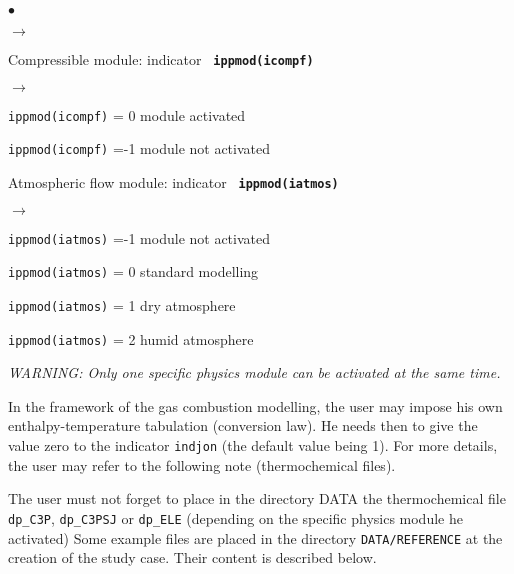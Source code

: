 {{{\begin{list}{$\bullet$}{}
\begin{list}{$\rightarrow$}{}
         \end{list}
       \item Compressible module: indicator {\bf \tt
             ippmod(icompf)}
        \begin{list}{$\rightarrow$}{}
               \item \texttt{ippmod(icompf)} = 0 module activated
               \item \texttt{ippmod(icompf)} =-1 module not activated
         \end{list}
       \item Atmospheric flow module: indicator {\bf \tt
             ippmod(iatmos)}
        \begin{list}{$\rightarrow$}{}
               \item \texttt{ippmod(iatmos)} =-1 module not activated
               \item \texttt{ippmod(iatmos)} = 0 standard modelling
               \item \texttt{ippmod(iatmos)} = 1 dry atmosphere
               \item \texttt{ippmod(iatmos)} = 2 humid atmosphere
         \end{list}
\end{list}

{\em WARNING: Only one specific physics module can be activated at the
same time.}

In the framework of the gas combustion modelling, the user may impose
his own enthalpy-temperature tabulation (conversion law). He needs then
to give the
value zero to the indicator \texttt{indjon} (the default value
being 1). For more details, the user may refer to the following note
(thermochemical files).

The user must not forget to place in the directory DATA the
thermochemical file \texttt{dp\_C3P}, \texttt{dp\_C3PSJ} or
\texttt{dp\_ELE} (depending on the specific physics module he activated)
Some example files are placed in the directory \texttt{DATA/REFERENCE} at the creation of the
study case. Their content is described below.

}}}
